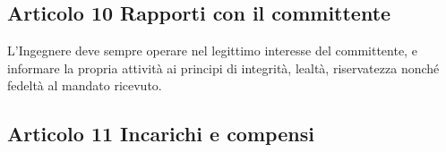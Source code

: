 \documentclass[letterpaper,10pt,italian]{sphinxmanual}
\begin{document}
\subsection{Articolo 10 \sphinxhyphen{} Rapporti con il committente}
\label{\detokenize{capitoli/codice/codice_deontologico:articolo-10-rapporti-con-il-committente}}\begin{description}
\sphinxAtStartPar
L’Ingegnere deve sempre operare nel legittimo interesse del committente, e informare la propria attività ai principi di integrità, lealtà, riservatezza nonché fedeltà al mandato ricevuto.

\end{description}


\subsection{Articolo 11 \sphinxhyphen{} Incarichi e compensi}
\end{document}
